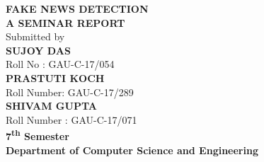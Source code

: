 \documentclass[a4paper,12pt]{article}
\begin{document}
	
	\begin{center}
		\large{
			\textbf{\Huge FAKE NEWS DETECTION}\\[2\baselineskip]
			\textbf{\large A SEMINAR REPORT}\\
			Submitted by\\[\baselineskip]
			\textbf{SUJOY DAS }\\
			Roll No : GAU-C-17/054\\[\baselineskip]
			\textbf{PRASTUTI KOCH}\\
			Roll Number: GAU-C-17/289\\[\baselineskip]
			\textbf{SHIVAM GUPTA}\\
			Roll Number : GAU-C-17/071\\[\baselineskip]
			\textbf{7\textsuperscript{th} Semester}\\
			\textbf{Department of Computer Science and Engineering}\\
			
}
\end{center}
\end{document}
